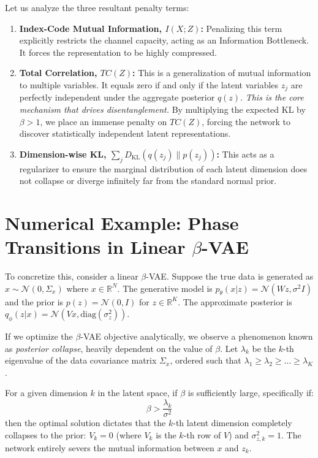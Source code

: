 Let us analyze the three resultant penalty terms:
\begin{enumerate}
    \item \textbf{Index-Code Mutual Information, $I(X; Z)$:} Penalizing this term explicitly restricts the channel capacity, acting as an Information Bottleneck. It forces the representation to be highly compressed.
    \item \textbf{Total Correlation, $TC(Z)$:} This is a generalization of mutual information to multiple variables. It equals zero if and only if the latent variables $z_j$ are perfectly independent under the aggregate posterior $q(z)$. \textit{This is the core mechanism that drives disentanglement.} By multiplying the expected KL by $\beta > 1$, we place an immense penalty on $TC(Z)$, forcing the network to discover statistically independent latent representations.
    \item \textbf{Dimension-wise KL, $\sum_j D_{\text{KL}}(q(z_j) \parallel p(z_j))$:} This acts as a regularizer to ensure the marginal distribution of each latent dimension does not collapse or diverge infinitely far from the standard normal prior.
\end{enumerate}

\section{Numerical Example: Phase Transitions in Linear $\beta$-VAE}

To concretize this, consider a linear $\beta$-VAE. Suppose the true data is generated as $x \sim \mathcal{N}(0, \Sigma_x)$ where $x \in \mathbb{R}^N$. The generative model is $p_\theta(x|z) = \mathcal{N}(Wz, \sigma^2 I)$ and the prior is $p(z) = \mathcal{N}(0, I)$ for $z \in \mathbb{R}^K$. The approximate posterior is $q_\phi(z|x) = \mathcal{N}(Vx, \text{diag}(\sigma_{z}^2))$.

If we optimize the $\beta$-VAE objective analytically, we observe a phenomenon known as \textit{posterior collapse}, heavily dependent on the value of $\beta$. Let $\lambda_k$ be the $k$-th eigenvalue of the data covariance matrix $\Sigma_x$, ordered such that $\lambda_1 \geq \lambda_2 \geq \dots \geq \lambda_K$.

For a given dimension $k$ in the latent space, if $\beta$ is sufficiently large, specifically if:
\begin{equation}
    \beta > \frac{\lambda_k}{\sigma^2}
\end{equation}
then the optimal solution dictates that the $k$-th latent dimension completely collapses to the prior: $V_k = 0$ (where $V_k$ is the $k$-th row of $V$) and $\sigma_{z,k}^2 = 1$. The network entirely severs the mutual information between $x$ and $z_k$. 

